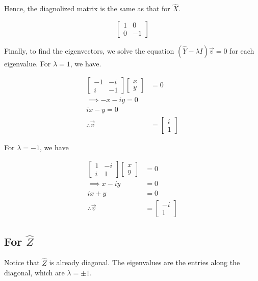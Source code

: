 \documentclass[12pt,a4paper]{article}
\begin{document}
			Hence, the diagnolized matrix is the same as that for $\hat{X}$.

			\begin{equation*}
				\begin{bmatrix} 1 & 0 \\ 0 & -1\end{bmatrix}
			\end{equation*}

			Finally, to find the eigenvectors, we solve the equation $(\hat{Y} - \lambda I)\vec{v} = 0$ for each eigenvalue. For $\lambda = 1$, we have.

			\begin{align*}
				\begin{bmatrix}
					-1 & -i \\ 
					i & -1
				\end{bmatrix}
				\begin{bmatrix}
					x \\
					y
				\end{bmatrix}
				&= 0 \\
				\implies - x - iy = 0 \\
				ix - y = 0 \\
				\therefore \vec{v} &= \begin{bmatrix} i \\ 1\end{bmatrix}
			\end{align*}

			For $\lambda = -1$, we have

			\begin{align*}
				\begin{bmatrix}
					1 & -i \\ 
					i & 1
				\end{bmatrix}
				\begin{bmatrix}
					x \\
					y
				\end{bmatrix}
				&= 0 \\
				\implies x - iy &= 0 \\
				ix + y &= 0 \\
				\therefore \vec{v} &= \begin{bmatrix} -i \\ 1\end{bmatrix}
			\end{align*}

		\subsection{For $\hat{Z}$}
			Notice that $\hat{Z}$ is already diagonal. The eigenvalues are the entries along the diagonal, which are $\lambda = \pm 1$.
			
\end{document}
